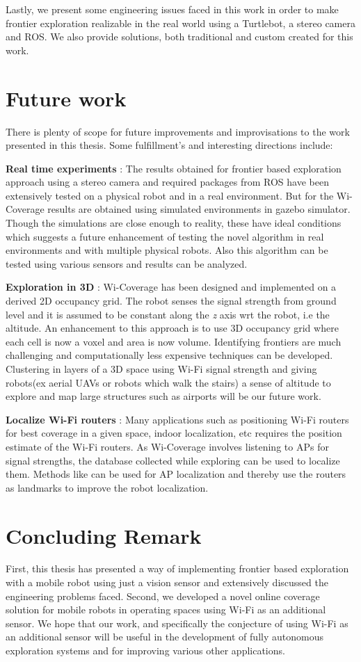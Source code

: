\par Lastly, we present some engineering issues faced in this work in order to make frontier exploration realizable in the real world using a Turtlebot, a stereo camera and ROS. We also provide solutions, both traditional and custom created for this work.

\section{Future work}
There is plenty of scope for future improvements and improvisations to the work presented in this thesis. Some fulfillment's and interesting directions include:

\textbf{Real time experiments} : The results obtained for frontier based exploration approach using a stereo camera and required packages from ROS have been extensively tested on a physical robot and in a real environment. But for the Wi-Coverage results are obtained using simulated environments in gazebo simulator. Though the simulations are close enough to reality, these have ideal conditions which suggests a future enhancement of testing the novel algorithm in real environments and with multiple physical robots. Also this algorithm can be tested using various sensors and results can be analyzed. 

\textbf{Exploration in 3D} : Wi-Coverage has been designed and implemented on a derived 2D occupancy grid. The robot senses the signal strength from ground level and it is assumed to be constant along the \textit{z} axis wrt the robot, i.e the altitude. An enhancement to this approach is to use 3D occupancy grid where each cell is now a voxel and area is now volume. Identifying frontiers are much challenging and computationally less expensive techniques can be developed. Clustering in layers of a 3D space using Wi-Fi signal strength and giving robots(ex aerial UAVs or robots which walk the stairs) a sense of altitude to explore and map large structures such as airports will be our future work. 

\textbf{Localize Wi-Fi routers} : Many applications such as positioning Wi-Fi routers for best coverage in a given space, indoor localization, etc requires the position estimate of the Wi-Fi routers. As Wi-Coverage involves listening to APs for signal strengths, the database collected while exploring can be used to localize them. Methods like \cite{29}\cite{30} can be used for AP localization and thereby use the routers as landmarks to improve the robot localization. 

\section{Concluding Remark}
First, this thesis has presented a way of implementing frontier based exploration with a mobile robot using just a vision sensor and extensively discussed the engineering problems faced. Second, we developed a novel online coverage solution for mobile robots in operating spaces using Wi-Fi as an additional sensor. We hope that our work, and specifically the conjecture of using Wi-Fi as an additional sensor will be useful in the development of fully autonomous exploration systems and for improving various other applications.